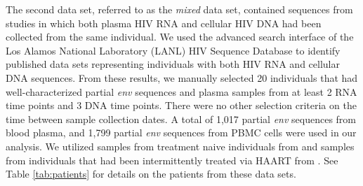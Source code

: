 \documentclass{bmcart}
\begin{document}
The second data set, referred to as the {\em mixed} data set, contained sequences from studies in which both plasma HIV RNA and cellular HIV DNA had been collected from the same individual.
We used the advanced search interface of the Los Alamos National Laboratory (LANL) HIV Sequence Database \cite{LosAlamos} to identify published data sets representing individuals with both HIV RNA and cellular DNA sequences.
From these results, we manually selected 20 individuals that had well-characterized partial {\em env} sequences and plasma samples from at least 2 RNA time points and 3 DNA time points. 
There were no other selection criteria on the time between sample collection dates. 
A total of 1,017 partial {\em env} sequences from blood plasma, and 1,799 partial {\em env} sequences from PBMC cells were used in our analysis. 
We utilized samples from treatment naive individuals from \cite{Shankarappa99, Novitsky09} and samples from individuals that had been intermittently treated via HAART from \cite{Llewellyn06,Fischer04}. 
See Table \ref{tab:patients} for details on the patients from these data sets.
\end{document}
